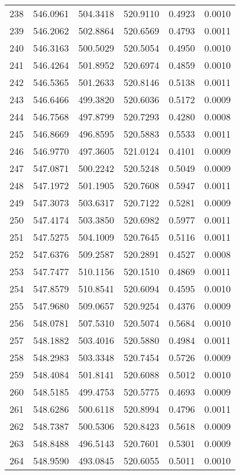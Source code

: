 \documentclass{article}
\begin{document}
\begin{longtable}{|c|c|c|c|c|c|}
238 & 546.0961 & 504.3418 & 520.9110 & 0.4923 & 0.0010 \\
239 & 546.2062 & 502.8864 & 520.6569 & 0.4793 & 0.0011 \\
240 & 546.3163 & 500.5029 & 520.5054 & 0.4950 & 0.0010 \\
241 & 546.4264 & 501.8952 & 520.6974 & 0.4859 & 0.0010 \\
242 & 546.5365 & 501.2633 & 520.8146 & 0.5138 & 0.0011 \\
243 & 546.6466 & 499.3820 & 520.6036 & 0.5172 & 0.0009 \\
244 & 546.7568 & 497.8799 & 520.7293 & 0.4280 & 0.0008 \\
245 & 546.8669 & 496.8595 & 520.5883 & 0.5533 & 0.0011 \\
246 & 546.9770 & 497.3605 & 521.0124 & 0.4101 & 0.0009 \\
247 & 547.0871 & 500.2242 & 520.5248 & 0.5049 & 0.0009 \\
248 & 547.1972 & 501.1905 & 520.7608 & 0.5947 & 0.0011 \\
249 & 547.3073 & 503.6317 & 520.7122 & 0.5281 & 0.0009 \\
250 & 547.4174 & 503.3850 & 520.6982 & 0.5977 & 0.0011 \\
251 & 547.5275 & 504.1009 & 520.7645 & 0.5116 & 0.0011 \\
252 & 547.6376 & 509.2587 & 520.2891 & 0.4527 & 0.0008 \\
253 & 547.7477 & 510.1156 & 520.1510 & 0.4869 & 0.0011 \\
254 & 547.8579 & 510.8541 & 520.6094 & 0.4595 & 0.0010 \\
255 & 547.9680 & 509.0657 & 520.9254 & 0.4376 & 0.0009 \\
256 & 548.0781 & 507.5310 & 520.5074 & 0.5684 & 0.0010 \\
257 & 548.1882 & 503.4016 & 520.5880 & 0.4984 & 0.0011 \\
258 & 548.2983 & 503.3348 & 520.7454 & 0.5726 & 0.0009 \\
259 & 548.4084 & 501.8141 & 520.6088 & 0.5012 & 0.0010 \\
260 & 548.5185 & 499.4753 & 520.5775 & 0.4693 & 0.0009 \\
261 & 548.6286 & 500.6118 & 520.8994 & 0.4796 & 0.0011 \\
262 & 548.7387 & 500.5306 & 520.8423 & 0.5618 & 0.0009 \\
263 & 548.8488 & 496.5143 & 520.7601 & 0.5301 & 0.0009 \\
264 & 548.9590 & 493.0845 & 520.6055 & 0.5011 & 0.0010 \\

\end{longtable}
\end{document}
